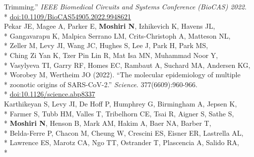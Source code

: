 \documentclass[margin,line]{res}
\begin{document}
\begin{resume}
\hspace*{9mm} Trimming.'' \textit{IEEE Biomedical Circuits and Systems Conference (BioCAS) 2022}.\\*\vspace{2mm}
\hspace*{8mm} \href{https://doi.org/10.1109/BioCAS54905.2022.9948621}{doi:10.1109/BioCAS54905.2022.9948621}\\
\hspace*{4mm} Pekar JE, Magee A, Parker E, \textbf{Moshiri N}, Izhikevich K, Havens JL,\\*
\hspace*{9mm} Gangavarapu K, Malpica Serrano LM, Crits-Christoph A, Matteson NL,\\*
\hspace*{9mm} Zeller M, Levy JI, Wang JC, Hughes S, Lee J, Park H, Park MS,\\*
\hspace*{9mm} Ching Zi Yan K, Tzer Pin Lin R, Mat Isa MN, Muhammad Noor Y,\\*
\hspace*{9mm} Vasylyeva TI, Garry RF, Homes EC, Rambaut A, Suchard MA, Andersen KG,\\*
\hspace*{9mm} Worobey M, Wertheim JO (2022). ``The molecular epidemiology of multiple\\*
\hspace*{9mm} zoonotic origins of SARS-CoV-2.'' \textit{Science}. 377(6609):960-966.\\*\vspace{2mm}
\hspace*{8mm} \href{https://doi.org/10.1126/science.abp8337}{doi:10.1126/science.abp8337}\\
\hspace*{4mm} Karthikeyan S, Levy JI, De Hoff P, Humphrey G, Birmingham A, Jepsen K,\\*
\hspace*{9mm} Farmer S, Tubb HM, Valles T, Tribelhorn CE, Tsai R, Aigner S, Sathe S,\\*
\hspace*{9mm} \textbf{Moshiri N}, Henson B, Mark AM, Hakim A, Baer NA, Barber T,\\*
\hspace*{9mm} Belda-Ferre P, Chacon M, Cheung W, Crescini ES, Eisner ER, Lastrella AL,\\*
\hspace*{9mm} Lawrence ES, Marotz CA, Ngo TT, Ostrander T, Plascencia A, Salido RA,\\*

\end{resume}
\end{document}
